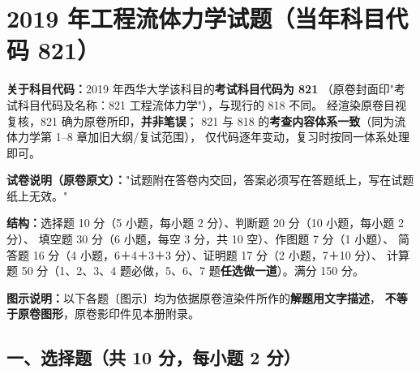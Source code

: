 \chapter{2019 年工程流体力学试题（当年科目代码 821）}

\begin{tishi}
\textbf{关于科目代码：}2019 年西华大学该科目的\textbf{考试科目代码为 821}
（原卷封面印"考试科目代码及名称：821 工程流体力学"），与现行的 818 不同。
经渲染原卷目视复核，821 确为原卷所印，\textbf{并非笔误}；
821 与 818 的\textbf{考查内容体系一致}（同为流体力学第 1--8 章加旧大纲/复试范围），
仅代码逐年变动，复习时按同一体系处理即可。

\textbf{试卷说明（原卷原文）：}"试题附在答卷内交回，答案必须写在答题纸上，写在试题纸上无效。"

\textbf{结构：}选择题 10 分（5 小题，每小题 2 分）、判断题 20 分（10 小题，每小题 2 分）、
填空题 30 分（6 小题，每空 3 分，共 10 空）、作图题 7 分（1 小题）、
简答题 16 分（4 小题，6＋4＋3＋3 分）、证明题 17 分（2 小题，7＋10 分）、
计算题 50 分（1、2、3、4 题必做，5、6、7 题\textbf{任选做一道}）。满分 150 分。

\textbf{图示说明：}以下各题〔图示〕均为依据原卷渲染件所作的\textbf{解题用文字描述}，
\textbf{不等于原卷图形}，原卷影印件见本册附录。
\end{tishi}

\section{一、选择题（共 10 分，每小题 2 分）}

